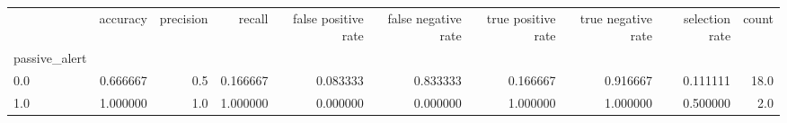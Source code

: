\begin{tabular}{lrrrrrrrrr}
\toprule
{} &  accuracy &  precision &    recall &  false positive rate &  false negative rate &  true positive rate &  true negative rate &  selection rate &  count \\
passive\_alert &           &            &           &                      &                      &                     &                     &                 &        \\
\midrule
0.0           &  0.666667 &        0.5 &  0.166667 &             0.083333 &             0.833333 &            0.166667 &            0.916667 &        0.111111 &   18.0 \\
1.0           &  1.000000 &        1.0 &  1.000000 &             0.000000 &             0.000000 &            1.000000 &            1.000000 &        0.500000 &    2.0 \\
\bottomrule
\end{tabular}
